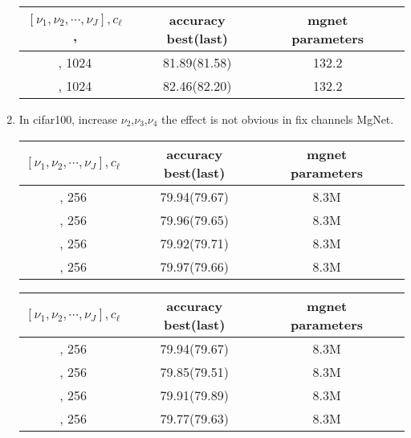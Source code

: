 \begin{enumerate}
\begin{table}[!htbp]
	\begin{center}
			\begin{tabular}{|c|c|c|c|}
				\hline
				$[\nu_1,\nu_2,\cdots,\nu_J], c_\ell$,  &  accuracy  best(last)   & mgnet parameters \tabularnewline
				\hline
				[2,2,2,2], 1024                        &   81.89(81.58)          & 132.2            \tabularnewline
				\hline
				[8,2,2,2], 1024                        &   82.46(82.20)          & 132.2            \tabularnewline
				\hline
			\end{tabular}
	\end{center}
\end{table}

\newpage
\item In cifar100, increase $\nu_2$,$\nu_3$,$\nu_4$ the effect is not obvious in fix channels MgNet.
\begin{table}[!htbp]
	\begin{center}
			\begin{tabular}{|c|c|c|c|}
				\hline
				$[\nu_1,\nu_2,\cdots,\nu_J], c_\ell$   &  accuracy best(last)  & mgnet parameters \tabularnewline
				\hline
				[2,2,2,2], 256                         &  79.94(79.67)         &     8.3M         \tabularnewline
				\hline		
				[2,4,2,2], 256                         &  79.96(79.65)         &     8.3M         \tabularnewline
				\hline
				[2,8,2,2], 256                         &  79.92(79.71)         &     8.3M         \tabularnewline
				\hline
				[2,16,2,2], 256                        &  79.97(79.66)         &     8.3M         \tabularnewline
				\hline
			\end{tabular}
	\end{center}
\end{table}


\begin{table}[!htbp]
	\begin{center}
			\begin{tabular}{|c|c|c|c|}
                \hline
				$[\nu_1,\nu_2,\cdots,\nu_J], c_\ell$   &  accuracy best(last)  & mgnet parameters \tabularnewline
				\hline
				[2,2,2,2], 256                         &  79.94(79.67)         &     8.3M         \tabularnewline
				\hline		
				[2,2,4,2], 256                         &  79.85(79.51)         &     8.3M         \tabularnewline
				\hline
				[2,2,8,2], 256                         &  79.91(79.89)         &     8.3M         \tabularnewline
				\hline
				[2,2,16,2], 256                        &  79.77(79.63)         &     8.3M         \tabularnewline
				\hline
			\end{tabular}
	\end{center}
\end{table}


\end{enumerate}
